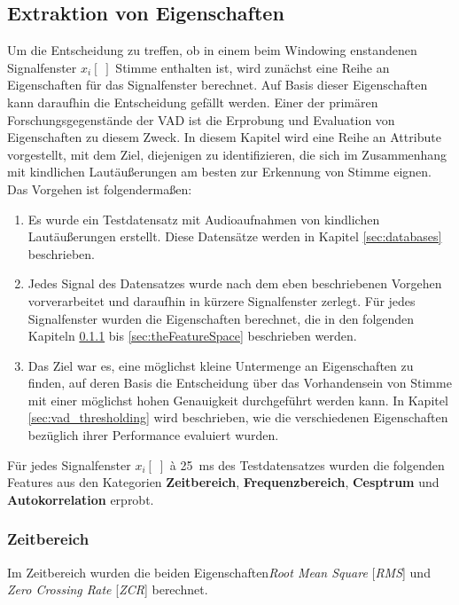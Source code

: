 \subsection{Extraktion von Eigenschaften}
\label{sec:featExtraction}

Um die Entscheidung zu treffen, ob in einem beim Windowing enstandenen Signalfenster $x_i[\;]$ Stimme enthalten ist, wird zunächst eine Reihe an Eigenschaften für das Signalfenster berechnet. Auf Basis dieser Eigenschaften kann daraufhin die Entscheidung gefällt werden. Einer der primären Forschungsgegenstände der VAD ist die Erprobung und Evaluation von Eigenschaften zu diesem Zweck. In diesem Kapitel wird eine Reihe an Attribute vorgestellt, mit dem Ziel, diejenigen zu identifizieren, die sich im Zusammenhang mit kindlichen Lautäußerungen am besten zur Erkennung von Stimme eignen. Das Vorgehen ist folgendermaßen:

\begin{enumerate}
	\item Es wurde ein Testdatensatz mit Audioaufnahmen von kindlichen Lautäußerungen erstellt. Diese Datensätze werden in Kapitel \ref{sec:databases} beschrieben.
	\item Jedes Signal des Datensatzes wurde nach dem eben beschriebenen Vorgehen vorverarbeitet und daraufhin in kürzere Signalfenster zerlegt. Für jedes Signalfenster wurden die Eigenschaften berechnet, die in den folgenden Kapiteln \ref{sec:timeFeats} bis \ref{sec:theFeatureSpace} beschrieben werden.
	\item Das Ziel war es, eine möglichst kleine Untermenge an Eigenschaften zu finden, auf deren Basis die Entscheidung über das Vorhandensein von Stimme mit einer möglichst hohen Genauigkeit durchgeführt werden kann. In Kapitel \ref{sec:vad_thresholding} wird beschrieben, wie die verschiedenen Eigenschaften bezüglich ihrer Performance evaluiert wurden.
\end{enumerate}

Für jedes Signalfenster $x_i[\;]$ à \SI{25}{\milli\second} des Testdatensatzes wurden die folgenden Features aus den Kategorien \textbf{Zeitbereich}, \textbf{Frequenzbereich}, \textbf{Cesptrum} und \textbf{Autokorrelation} erprobt. 

\subsubsection{Zeitbereich}
\label{sec:timeFeats}

Im Zeitbereich wurden die beiden Eigenschaften\emph{Root Mean Square} [\emph{RMS}] und \emph{Zero Crossing Rate} [\emph{ZCR}] berechnet.

